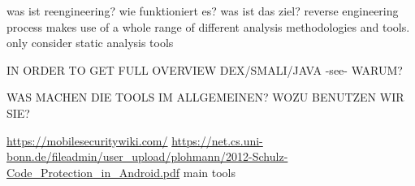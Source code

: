 was ist reengineering? wie funktioniert es? was ist das ziel?\newline
reverse engineering process makes use of a whole range of different analysis
methodologies and tools.\newline
only consider static analysis tools\newline

IN ORDER TO GET FULL OVERVIEW DEX/SMALI/JAVA -see- WARUM?\newline

WAS MACHEN DIE TOOLS IM ALLGEMEINEN? WOZU BENUTZEN WIR SIE?\newline

\url{https://mobilesecuritywiki.com/}\newline
\url{https://net.cs.uni-bonn.de/fileadmin/user_upload/plohmann/2012-Schulz-Code_Protection_in_Android.pdf}\newline
main tools\newline
